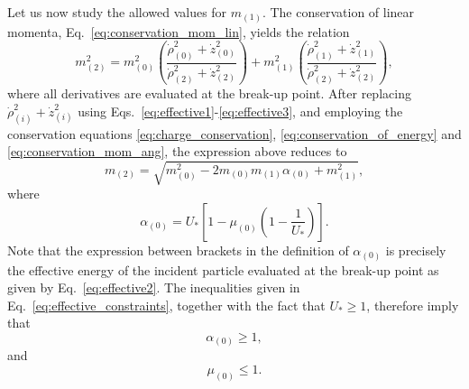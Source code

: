 Let us now study the allowed values for $m_{(1)}$. The conservation of linear momenta, Eq.~\eqref{eq:conservation_mom_lin}, yields the relation
\begin{equation} \label{eq:mass2_eq1}
  m_{(2)}^2  = m_{(0)}^2 \left( \frac{\dot \rho_{(0)} ^2 +  \dot z_{(0)} ^2 }{\dot \rho_{(2)} ^2 + \dot z_{(2)} ^2 } \right) + m_{(1)}^2 \left( \frac{\dot \rho_{(1)} ^2 + \dot z_{(1)} ^2 }{\dot \rho_{(2)} ^2 + \dot z_{(2)} ^2 } \right),
\end{equation}
where all derivatives are evaluated at the break-up point.
After replacing $\dot \rho_{(i)} ^2 + \dot z_{(i)} ^2$ using Eqs.~\eqref{eq:effective1}-\eqref{eq:effective3}, and employing the conservation equations  \eqref{eq:charge_conservation}, \eqref{eq:conservation_of_energy} and \eqref{eq:conservation_mom_ang}, the expression above reduces to
\begin{equation} \label{eq:mass2_eq2}
  m_{(2)} = \sqrt{m_{(0)}^2 - 2 m_{(0)} m_{(1)} \alpha_{(0)} + m_{(1)}^2},
\end{equation}
where
\begin{equation} \label{eq:alpha_definition}
  \alpha_{(0)} =  U_* \left[ 1 - \mu_{(0)}\left(1 - \frac{1}{U_*}\right) \right].
\end{equation}
Note that the expression between brackets in the definition of $\alpha_{(0)}$ is precisely the effective energy of the incident particle evaluated at the break-up point as given by Eq.~\eqref{eq:effective2}. The inequalities given in Eq.~\eqref{eq:effective_constraints}, together with the fact that $U_* \ge 1$, therefore imply that
\begin{equation} \label{eq:alpha_constraint}
  \alpha_{(0)} \ge 1,
\end{equation}
and
\begin{equation} \label{eq:mu0max}
  \mu_{(0)} \le 1.
\end{equation}

